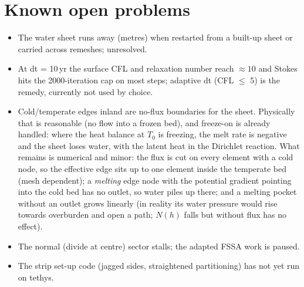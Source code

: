 \documentclass[10pt,a4paper]{article}
\begin{document}
\section{Known open problems}
\begin{itemize}
\item The water sheet runs away (metres) when restarted from a built-up sheet or carried across remeshes; unresolved.
\item At dt = 10\,yr the surface CFL and relaxation number reach $\approx10$ and Stokes hits the 2000-iteration cap on
most steps; adaptive dt (CFL $\le$ 5) is the remedy, currently not used by choice.
\item Cold/temperate edges inland are no-flux boundaries for the sheet. Physically that is reasonable (no flow into a
frozen bed), and freeze-on is already handled: where the heat balance at $T_0$ is freezing, the melt rate is negative
and the sheet loses water, with the latent heat in the Dirichlet reaction. What remains is numerical and minor:
the flux is cut on every element with a cold node, so the effective edge sits up to one element inside the temperate
bed (mesh dependent); a \emph{melting} edge node with the potential gradient pointing into the cold bed has no outlet,
so water piles up there; and a melting pocket without an outlet grows linearly (in reality its water pressure would
rise towards overburden and open a path; $N(h)$ falls but without flux has no effect).
\item The normal (divide at centre) sector stalls; the adapted FSSA work is paused.
\item The strip set-up code (jagged sides, straightened partitioning) has not yet run on tethys.
\end{itemize}
\end{document}
